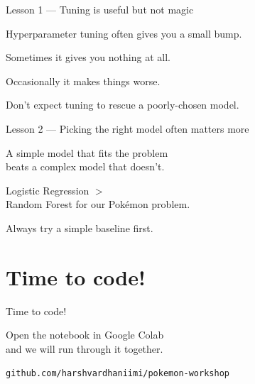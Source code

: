 \documentclass[aspectratio=169, 11pt]{beamer}
\begin{document}
\begin{frame}{Lesson 1 — Tuning is useful but not magic}
    \vspace{0.5cm}
    \begin{center}
        \Large
        Hyperparameter tuning often gives you a small bump.

        \vspace{0.5cm}
        Sometimes it gives you nothing at all.

        \vspace{0.5cm}
        Occasionally it makes things worse.
    \end{center}

    \vspace{0.6cm}
    Don't expect tuning to rescue a poorly-chosen model.
\end{frame}

\begin{frame}{Lesson 2 — Picking the right model often matters more}
    \vspace{0.5cm}
    \begin{center}
        \Large
        A simple model that fits the problem\\
        beats a complex model that doesn't.

        \vspace{0.5cm}
        \textcolor{waterblue}{Logistic Regression} $>$\\\textcolor{firered}{Random Forest} for our Pokémon problem.
    \end{center}

    \vspace{0.6cm}
    Always try a simple baseline first.
\end{frame}

\section{Time to code!}
\begin{frame}
    \centering
    \Huge \textcolor{ausred}{Time to code!}

    \vspace{1cm}
    \large
    Open the notebook in Google Colab\\
    and we will run through it together.

    \vspace{1cm}
    \texttt{\small github.com/harshvardhaniimi/pokemon-workshop}
\end{frame}
\end{document}
